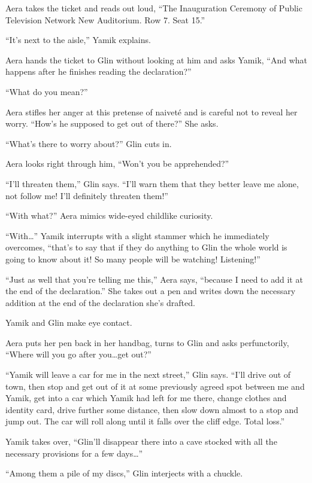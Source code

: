 \documentclass[twoside,11pt,openany]{book}
\begin{document}
Aera takes the ticket and reads out loud, ``The Inauguration Ceremony of Public Television Network New
Auditorium. Row 7. Seat 15.''

``It's next to the aisle,'' Yamik explains.

Aera hands the ticket to Glin without looking at him and asks Yamik, ``And what happens after he finishes
reading the declaration?''

``What do you mean?''

Aera stifles her anger at this pretense of naivet\'e and is careful not to reveal her worry. ``How's he
supposed to get out of there?'' She asks.

``What's there to worry about?'' Glin cuts in{.}

Aera looks right through him, ``Won't you be apprehended?''

``I'll threaten them,'' Glin says. ``I'll warn them that they better leave me
alone, not follow me! I'll definitely threaten them!''

``With what?'' Aera mimics wide-eyed childlike curiosity.

``With{\ldots}'' Yamik interrupts with a slight stammer which he immediately overcomes,
``that's to say that if they do anything to Glin the whole world
is going to know about it! So many people
will be watching! Listening!''

``Just as well that you're telling me this,'' Aera says, ``because I need to add
it at the end of the declaration.'' She takes out a pen and writes down the necessary addition at the end
of the declaration she's drafted.

Yamik and Glin make eye contact.

Aera puts her pen back in her handbag, turns to Glin and asks perfunctorily, ``Where will you go after
you{\ldots}get out?''

``Yamik will leave a car for me in the next street,'' Glin says. ``I'll drive out
of town, then stop and get out of it at some previously agreed spot between me and Yamik, get into a car which Yamik
had left for me there, change clothes and identity card, drive further some distance, then slow down almost to a stop
and jump out. The car will roll along until it falls over the cliff edge. Total loss.''

Yamik takes over, ``Glin'll disappear there into a cave stocked with all the necessary provisions for a few
days{\ldots}''

``Among them a pile of my discs,'' Glin interjects with a chuckle.
\end{document}
